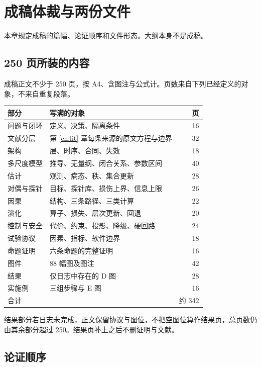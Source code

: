 \chapter{成稿体裁与两份文件}
\label{ch:deliver}

本章规定成稿的篇幅、论证顺序和文件形态。大纲本身不是成稿。

\section{250 页所装的内容}

成稿正文不少于 250 页，按 A4、含图注与公式计。页数来自下列已经定义的对象，不来自重复段落。

\begin{center}
\begin{tabularx}{\textwidth}{lXr}
\toprule
部分 & 写满的对象 & 页 \\
\midrule
问题与闭环 & 定义、决策、隔离条件 & 16 \\
文献分层 & 第 \ref{ch:lit} 章每条来源的原文方程与边界 & 32 \\
架构 & 层、时序、合同、失效 & 18 \\
多尺度模型 & 推导、无量纲、闭合关系、参数区间 & 40 \\
估计 & 观测、病态、秩、集合更新 & 28 \\
对偶与探针 & 目标、探针库、损伤上界、信息上限 & 26 \\
因果 & 结构、三条路径、三类计算 & 22 \\
演化 & 算子、损失、层次更新、回退 & 20 \\
控制与安全 & 代价、约束、投影、降级、硬回路 & 24 \\
试验协议 & 因素、指标、软件边界 & 18 \\
命题证明 & 六条命题的完整证明 & 16 \\
图件 & 88 幅图及图注 & 42 \\
结果 & 仅日志中存在的 D 图 & 28 \\
实施例 & 三组步骤与 E 图 & 16 \\
\midrule
合计 &  & 约 342 \\
\bottomrule
\end{tabularx}
\end{center}

结果部分若日志未完成，正文保留协议与图位，不把空图位算作结果页，总页数仍由其余部分超过 250。结果页补上之后不删证明与文献。

\section{论证顺序}

